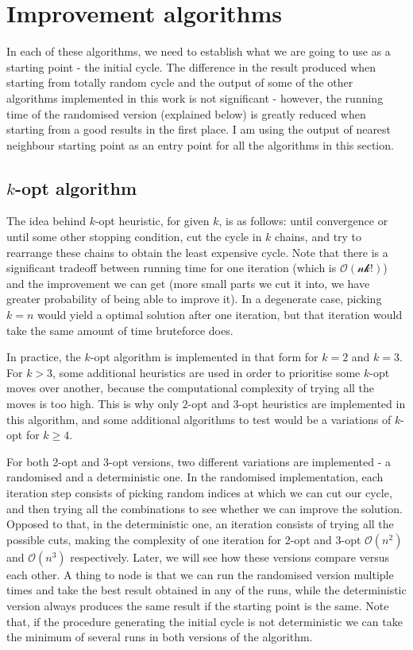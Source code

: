 \documentclass[12pt,twoside,notitlepage]{report}
\begin{document}
\section{Improvement algorithms}

In each of these algorithms, we need to establish what we are going to use as a starting point - the initial cycle. The difference in the result produced when starting from totally random cycle and the output of some of the other algorithms implemented in this work is not significant - however, the running time of the randomised version (explained below) is greatly reduced when starting from a good results in the first place. I am using the output of nearest neighbour starting point as an entry point for all the algorithms in this section.

\subsection{$k$-opt algorithm}

The idea behind $k$-opt heuristic, for given $k$, is as follows: until convergence or until some other stopping condition, cut the cycle in $k$ chains, and try to rearrange these chains to obtain the least expensive cycle. Note that there is a significant tradeoff between running time for one iteration (which is $\mathcal{O(nk!)}$) and the improvement we can get (more small parts we cut it into, we have greater probability of being able to improve it). In a degenerate case, picking $k = n$ would yield a optimal solution after one iteration, but that iteration would take the same amount of time bruteforce does. 

\smallskip

In practice, the $k$-opt algorithm is implemented in that form for $k = 2$ and $k = 3$\cite{inproceedings}. For $k > 3$, some additional heuristics are used in order to prioritise some $k$-opt moves over another, because the computational complexity of trying all the moves is too high. This is why only $2$-opt and $3$-opt heuristics are implemented in this algorithm, and some additional algorithms to test would be a variations of $k$-opt for $k \geq 4$.

For both 2-opt and 3-opt versions, two different variations are implemented - a randomised and a deterministic one. In the randomised implementation, each iteration step consists of picking random indices at which we can cut our cycle, and then trying all the combinations to see whether we can improve the solution. Opposed to that, in the deterministic one, an iteration consists of trying all the possible cuts, making the complexity of one iteration for 2-opt and 3-opt $\mathcal{O}(n^2)$ and $\mathcal{O}(n^3)$ respectively. Later, we will see how these versions compare versus each other. A thing to node is that we can run the randomised version multiple times and take the best result obtained in any of the runs, while the deterministic version always produces the same result if the starting point is the same. Note that, if the procedure generating the initial cycle is not deterministic we can take the minimum of several runs in both versions of the algorithm.
\end{document}
